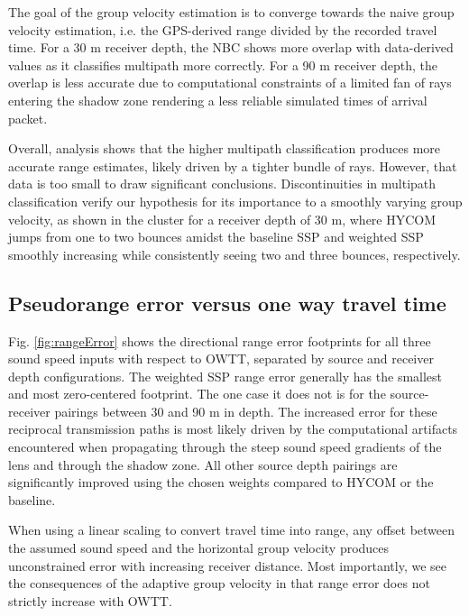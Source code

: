 The goal of the group velocity estimation is to converge towards the naive group velocity estimation, i.e. the GPS-derived range divided by the recorded travel time.
For a 30 m receiver depth, the NBC shows more overlap with data-derived values as it classifies multipath more correctly.
For a 90 m receiver depth, the overlap is less accurate due to computational constraints of a limited fan of rays entering the shadow zone rendering a less reliable simulated times of arrival packet.

Overall, analysis shows that the higher multipath classification produces more accurate range estimates, likely driven by a tighter bundle of rays.
However, that data is too small to draw significant conclusions.
Discontinuities in multipath classification verify our hypothesis for its importance to a smoothly varying group velocity, as shown in the cluster for a receiver depth of 30 m, where HYCOM jumps from one to two bounces amidst the baseline SSP and weighted SSP smoothly increasing while consistently seeing two and three bounces, respectively.

\FloatBarrier
\subsection{Pseudorange error versus one way travel time}

Fig. \ref{fig:rangeError} shows the directional range error footprints for all three sound speed inputs with respect to OWTT, separated by source and receiver depth configurations.
The weighted SSP range error generally has the smallest and most zero-centered footprint.
The one case it does not is for the source-receiver pairings between 30 and 90 m in depth.
The increased error for these reciprocal transmission paths is most likely driven by the computational artifacts encountered when propagating through the steep sound speed gradients of the lens and through the shadow zone.
All other source depth pairings are significantly improved using the chosen weights compared to HYCOM or the baseline.

When using a linear scaling to convert travel time into range, any offset between the assumed sound speed and the horizontal group velocity produces unconstrained error with increasing receiver distance.
Most importantly, we see the consequences of the adaptive group velocity in that range error does not strictly increase with OWTT.

